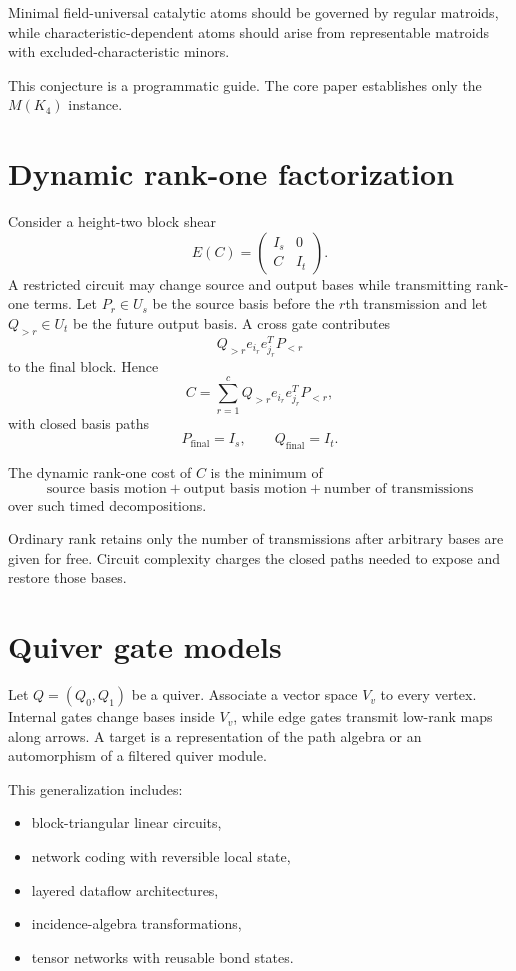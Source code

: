 \begin{conjecturebox}
Minimal field-universal catalytic atoms should be governed by regular matroids, while characteristic-dependent atoms should arise from representable matroids with excluded-characteristic minors.
\end{conjecturebox}
This conjecture is a programmatic guide.  The core paper establishes only the $M(K_4)$ instance.

\section{Dynamic rank-one factorization}
Consider a height-two block shear
\[
E(C)=
\begin{pmatrix}
I_s&0\\
C&I_t
\end{pmatrix}.
\]
A restricted circuit may change source and output bases while transmitting rank-one terms.  Let $P_r\in U_s$ be the source basis before the $r$th transmission and let $Q_{>r}\in U_t$ be the future output basis.  A cross gate contributes
\[
Q_{>r}e_{i_r}e_{j_r}^{T}P_{<r}
\]
to the final block.  Hence
\[
C=
\sum_{r=1}^{c}
Q_{>r}e_{i_r}e_{j_r}^{T}P_{<r},
\]
with closed basis paths
\[
P_{\mathrm{final}}=I_s,
\qquad
Q_{\mathrm{final}}=I_t.
\]

\begin{definition}
The dynamic rank-one cost of $C$ is the minimum of
\[
\text{source basis motion}
+
\text{output basis motion}
+
\text{number of transmissions}
\]
over such timed decompositions.
\end{definition}
Ordinary rank retains only the number of transmissions after arbitrary bases are given for free.  Circuit complexity charges the closed paths needed to expose and restore those bases.

\section{Quiver gate models}
Let $Q=(Q_0,Q_1)$ be a quiver.  Associate a vector space $V_v$ to every vertex.  Internal gates change bases inside $V_v$, while edge gates transmit low-rank maps along arrows.  A target is a representation of the path algebra or an automorphism of a filtered quiver module.

This generalization includes:
\begin{itemize}
\item block-triangular linear circuits,
\item network coding with reversible local state,
\item layered dataflow architectures,
\item incidence-algebra transformations,
\item tensor networks with reusable bond states.
\end{itemize}

